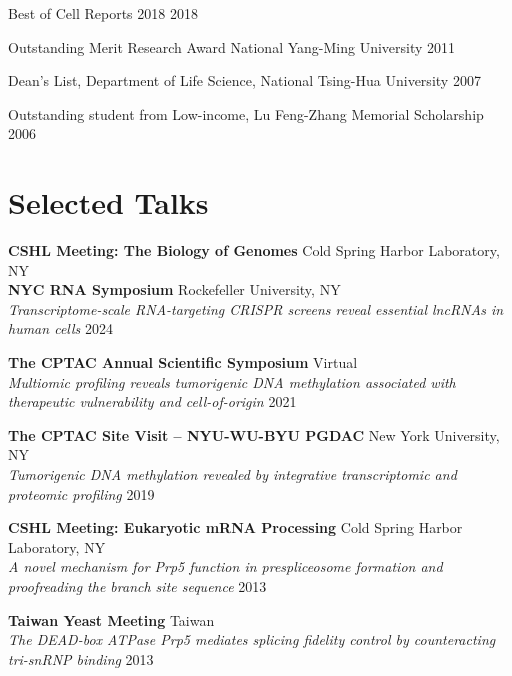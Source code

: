 \documentclass[letterpaper,11pt]{cv}
\begin{document}
\begin{detaillist}

\item Best of Cell Reports 2018
    \hfill 2018

\item Outstanding Merit Research Award National Yang-Ming University
    \hfill 2011

\item Dean's List, Department of Life Science, National Tsing-Hua University
    \hfill 2007

\item Outstanding student from Low-income, Lu Feng-Zhang Memorial Scholarship
    \hfill
    2006

\end{detaillist}

\section{Selected Talks}
\begin{entrylist}
    \item \textbf{CSHL Meeting: The Biology of Genomes} \hfill Cold Spring Harbor Laboratory, NY \\
    \textbf{NYC RNA Symposium} \hfill Rockefeller University, NY \\
    \textit{\small{Transcriptome-scale RNA-targeting CRISPR screens reveal essential lncRNAs in human cells}}
    \hfill 2024 

    \item \textbf{The CPTAC Annual Scientific Symposium} \hfill Virtual \\
    \textit{\small{Multiomic profiling reveals tumorigenic DNA methylation associated with therapeutic vulnerability and cell-of-origin}} \hfill 2021

    \item \textbf{The CPTAC Site Visit – NYU-WU-BYU PGDAC} \hfill New York University, NY \\
    \textit{\small{Tumorigenic DNA methylation revealed by integrative transcriptomic and proteomic profiling}} \hfill 2019

    \item \textbf{CSHL Meeting: Eukaryotic mRNA Processing} \hfill Cold Spring Harbor Laboratory, NY \\
    \textit{\small{A novel mechanism for Prp5 function in prespliceosome formation and proofreading the branch site sequence}}
    \hfill 2013

    \item \textbf{Taiwan Yeast Meeting} \hfill Taiwan \\
    \textit{\small{The DEAD-box ATPase Prp5 mediates splicing fidelity control by counteracting tri-snRNP binding}}
    \hfill 2013
\end{entrylist}
\end{document}
